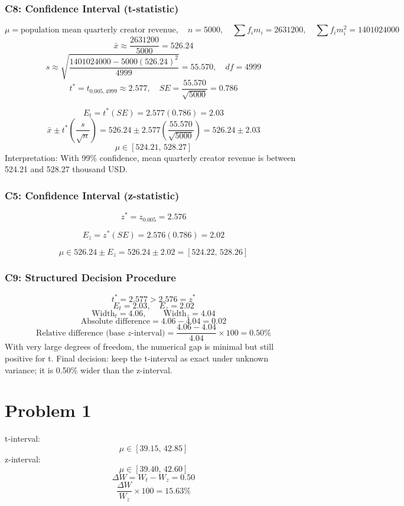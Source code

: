\begin{ExamProblems}
		\subsubsection*{C8: Confidence Interval (t-statistic)}
		\[
		\mu=\text{population mean quarterly creator revenue},\quad n=5000,\quad \sum f_im_i=2631200,\quad \sum f_im_i^2=1401024000
		\]
		\[
		\bar{x}\approx\frac{2631200}{5000}=526.24
		\]
		\[
		s\approx\sqrt{\frac{1401024000-5000(526.24)^2}{4999}}=55.570,\quad df=4999
		\]
		\[
		t^*=t_{0.005,4999}\approx 2.577,\quad SE=\frac{55.570}{\sqrt{5000}}=0.786
		\]

		\[
		E_t=t^*(SE)=2.577(0.786)=2.03
		\]
		\[
		\bar{x}\pm t^*\left(\frac{s}{\sqrt{n}}\right)=526.24\pm 2.577\left(\frac{55.570}{\sqrt{5000}}\right)=526.24\pm 2.03
		\]
		\[
		\mu\in[524.21,\,528.27]
		\]
		Interpretation: With 99\% confidence, mean quarterly creator revenue is between 524.21 and 528.27 thousand USD.

		\subsubsection*{C5: Confidence Interval (z-statistic)}
		\[
		z^*=z_{0.005}=2.576
		\]

		\[
		E_z=z^*(SE)=2.576(0.786)=2.02
		\]

		\[
		\mu\in 526.24\pm E_z=526.24\pm 2.02=[524.22,\,528.26]
		\]

		\subsubsection*{C9: Structured Decision Procedure}
		\[
		t^*=2.577>2.576=z^*
		\]
		\[
		E_t=2.03,\quad E_z=2.02
		\]
		\[
		\text{Width}_t=4.06,\qquad \text{Width}_z=4.04
		\]
		\[
		\text{Absolute difference}=4.06-4.04=0.02
		\]
		\[
		\text{Relative difference (base }z\text{-interval)}=\frac{4.06-4.04}{4.04}\times 100=0.50\%
		\]
		With very large degrees of freedom, the numerical gap is minimal but still positive for t.
		Final decision: keep the t-interval as exact under unknown variance; it is 0.50\% wider than the z-interval.
	\end{ExamProblems}

	\section{Problem 1}
	t-interval:
	\[
	\mu \in [39.15,\,42.85]
	\]
	z-interval:
	\[
	\mu \in [39.40,\,42.60]
	\]
	\[
	\Delta W = W_t - W_z = 0.50
	\]
	\[
	\frac{\Delta W}{W_z}\times 100 = 15.63\%
	\]

